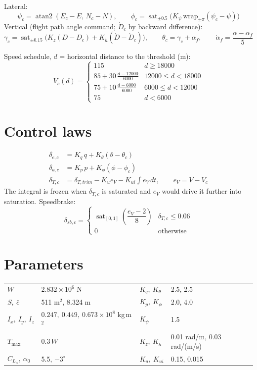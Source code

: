 \documentclass[10pt]{article}
\newcommand{\sat}{\operatorname{sat}}
\begin{document}
Lateral:
\[
\psi_c=\operatorname{atan2}(E_c-E,\,N_c-N),\qquad
\phi_c=\sat_{\pm0.5}\big(K_\psi\,\mathrm{wrap}_{\pm\pi}(\psi_c-\psi)\big)
\]
Vertical (flight path angle command; $\dot D_c$ by backward difference):
\[
\gamma_c=\sat_{\pm0.15}\big(K_z(D-D_c)+K_{\dot h}(\dot D-\dot D_c)\big),\qquad
\theta_c=\gamma_c+\alpha_f,\qquad \dot\alpha_f=\frac{\alpha-\alpha_f}{5}
\]

Speed schedule, $d$ = horizontal distance to the threshold (m):
\[
V_c(d)=\begin{cases}
115 & d\ge18000\\
85+30\,\frac{d-12000}{6000} & 12000\le d<18000\\
75+10\,\frac{d-6000}{6000} & 6000\le d<12000\\
75 & d<6000
\end{cases}
\]

\section{Control laws}
\begin{align*}
\delta_{e,c} &= K_q\,q + K_\theta(\theta-\theta_c)\\
\delta_{a,c} &= K_p\,p + K_\phi(\phi-\phi_c)\\
\delta_{T,c} &= \delta_{T,trim} - K_u e_V - K_{ui}\textstyle\int e_V\,dt,\qquad e_V=V-V_c
\end{align*}
The integral is frozen when $\delta_{T,c}$ is saturated and $e_V$ would drive it further into saturation. Speedbrake:
\[
\delta_{sb,c}=\begin{cases}\sat_{[0,1]}\!\left(\dfrac{e_V-2}{8}\right) & \delta_{T,c}\le0.06\\ 0 & \text{otherwise}\end{cases}
\]

\section{Parameters}
\begin{tabular}{@{}ll@{\qquad}ll@{}}
\toprule
$W$ & $2.832\times10^6$ N & $K_q,\ K_\theta$ & 2.5, 2.5 \\
$S,\ \bar c$ & 511 m$^2$, 8.324 m & $K_p,\ K_\phi$ & 2.0, 4.0 \\
$I_x,\ I_y,\ I_z$ & $0.247,\ 0.449,\ 0.673\times10^8$ kg\,m$^2$ & $K_\psi$ & 1.5 \\
$T_{\max}$ & $0.3\,W$ & $K_z,\ K_{\dot h}$ & 0.01 rad/m, 0.03 rad/(m/s) \\
$C_{L_\alpha},\ \alpha_0$ & 5.5, $-3^\circ$ & $K_u,\ K_{ui}$ & 0.15, 0.015 \\
\bottomrule
\end{tabular}
\end{document}

